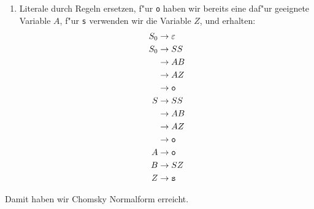{\begin{loesung}
\begin{enumerate}
\begin{align*}
 &\rightarrow AB\\
 &\rightarrow {\tt o}{\tt s}\\
 &\rightarrow {\tt o}\\
A&\rightarrow {\tt o}\\
B&\rightarrow S{\tt s}
\end{align*}
\item Literale durch Regeln ersetzen, f"ur {\tt o} haben wir bereits
eine daf"ur geeignete Variable  $A$, f"ur {\tt s} verwenden wir die
Variable $Z$, und erhalten:
\begin{align*}
S_0&\rightarrow \varepsilon\\
S_0&\rightarrow SS\\
   &\rightarrow AB\\
   &\rightarrow AZ\\
   &\rightarrow {\tt o}\\
S&\rightarrow SS\\
 &\rightarrow AB\\
 &\rightarrow AZ\\
 &\rightarrow {\tt o}\\
A&\rightarrow {\tt o}\\
B&\rightarrow SZ\\
Z&\rightarrow {\tt s}
\end{align*}
\end{enumerate}
Damit haben wir Chomsky Normalform erreicht.
\end{loesung}
}{}

